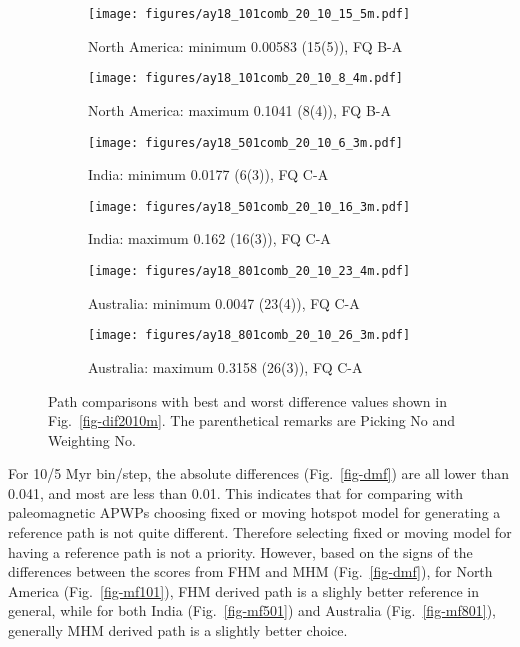 \begin{figure*}
	\centering
	\begin{subfigure}{.43\textwidth}
		\texttt{[image: figures/ay18\_101comb\_20\_10\_15\_5m.pdf]}
		\caption{North America: minimum 0.00583 (15(5)), FQ B-A}\label{fig-nac-2010155m}
	\end{subfigure}
	\begin{subfigure}{.43\textwidth}
		\texttt{[image: figures/ay18\_101comb\_20\_10\_8\_4m.pdf]}
		\caption{North America: maximum 0.1041 (8(4)), FQ B-A}\label{fig-nac-201084m}
	\end{subfigure}
	\vspace{.1em}
	\begin{subfigure}{.43\textwidth}
		\texttt{[image: figures/ay18\_501comb\_20\_10\_6\_3m.pdf]}
		\caption{India: minimum 0.0177 (6(3)), FQ C-A}\label{fig-ind-201063m}
	\end{subfigure}
	\begin{subfigure}{.43\textwidth}
		\texttt{[image: figures/ay18\_501comb\_20\_10\_16\_3m.pdf]}
		\caption{India: maximum 0.162 (16(3)), FQ C-A}\label{fig-ind-2010163m}
	\end{subfigure}
	\vspace{.1em}
	\begin{subfigure}{.43\textwidth}
		\texttt{[image: figures/ay18\_801comb\_20\_10\_23\_4m.pdf]}
		\caption{Australia: minimum 0.0047 (23(4)), FQ C-A}\label{fig-au-2010234m}
	\end{subfigure}
	\begin{subfigure}{.43\textwidth}
		\texttt{[image: figures/ay18\_801comb\_20\_10\_26\_3m.pdf]}
		\caption{Australia: maximum 0.3158 (26(3)), FQ C-A}\label{fig-au-2010263m}
	\end{subfigure}
	\caption[Best and worst differences (20 Myr bin, 10 Myr
step)]{Path comparisons with best and worst difference values shown in
Fig.~\ref{fig-dif2010m}. The parenthetical remarks are Picking No and Weighting No.}\label{fig-dif2010bwm}
\end{figure*}

For 10/5 Myr bin/step, the absolute differences (Fig.~\ref{fig-dmf}) are all
lower than 0.041, and most are less than 0.01. This indicates that for comparing
with paleomagnetic APWPs choosing fixed or moving hotspot model for generating a
reference path is not quite different. Therefore selecting fixed or moving model
for having a reference path is not a priority. However, based on the signs of
the differences between the scores from FHM and MHM (Fig.~\ref{fig-dmf}), for
North America (Fig.~\ref{fig-mf101}), FHM derived path is a slighly better
reference in general, while for both India (Fig.~\ref{fig-mf501}) and Australia
(Fig.~\ref{fig-mf801}), generally MHM derived path is a slightly better choice.

